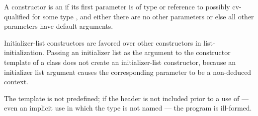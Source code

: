 \pnum
A constructor is an  if its first parameter is
of type  or reference to possibly cv-qualified
 for some type , and either there are no other
parameters or else all other parameters have default arguments.
\begin{note}
Initializer-list constructors are favored over other constructors in
list-initialization. Passing an initializer list as the argument
to the constructor template  of a class  does not
create an initializer-list constructor, because an initializer list argument causes the
corresponding parameter to be a non-deduced context.
\end{note}
The template
 is not predefined; if the header
 is not included prior to a use of
 --- even an implicit use in which the type is not
named --- the program is ill-formed.

